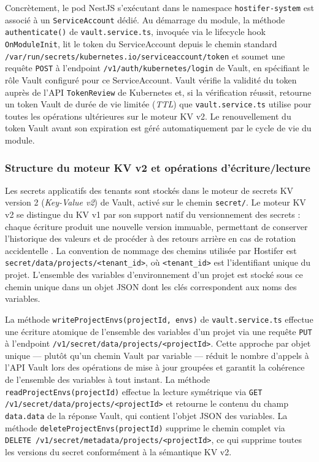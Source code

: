 Concrètement, le pod NestJS s'exécutant dans le namespace \texttt{hostifer-system} est associé à un \texttt{ServiceAccount} dédié. Au démarrage du module, la méthode \texttt{authenticate()} de \texttt{vault.service.ts}, invoquée via le lifecycle hook \texttt{OnModuleInit}, lit le token du ServiceAccount depuis le chemin standard \texttt{/var/run/secrets/kubernetes.io/serviceaccount/token} et soumet une requête \texttt{POST} à l'endpoint \texttt{/v1/auth/kubernetes/login} de Vault, en spécifiant le rôle Vault configuré pour ce ServiceAccount. Vault vérifie la validité du token auprès de l'API \texttt{TokenReview} de Kubernetes et, si la vérification réussit, retourne un token Vault de durée de vie limitée (\textit{TTL}) que \texttt{vault.service.ts} utilise pour toutes les opérations ultérieures sur le moteur KV v2. Le renouvellement du token Vault avant son expiration est géré automatiquement par le cycle de vie du module.

\subsubsection*{Structure du moteur KV v2 et opérations d'écriture/lecture}

Les secrets applicatifs des tenants sont stockés dans le moteur de secrets KV version 2 (\textit{Key-Value v2}) de Vault, activé sur le chemin \texttt{secret/}. Le moteur KV v2 se distingue du KV v1 par son support natif du versionnement des secrets : chaque écriture produit une nouvelle version immuable, permettant de conserver l'historique des valeurs et de procéder à des retours arrière en cas de rotation accidentelle \cite{vault-kv2}. La convention de nommage des chemins utilisée par Hostifer est \texttt{secret/data/projects/<tenant\_id>}, où \texttt{<tenant\_id>} est l'identifiant unique du projet. L'ensemble des variables d'environnement d'un projet est stocké sous ce chemin unique dans un objet JSON dont les clés correspondent aux noms des variables.

La méthode \texttt{writeProjectEnvs(projectId, envs)} de \texttt{vault.service.ts} effectue une écriture atomique de l'ensemble des variables d'un projet via une requête \texttt{PUT} à l'endpoint \texttt{/v1/secret/data/projects/<projectId>}. Cette approche par objet unique — plutôt qu'un chemin Vault par variable — réduit le nombre d'appels à l'API Vault lors des opérations de mise à jour groupées et garantit la cohérence de l'ensemble des variables à tout instant. La méthode \texttt{readProjectEnvs(projectId)} effectue la lecture symétrique via \texttt{GET /v1/secret/data/projects/<projectId>} et retourne le contenu du champ \texttt{data.data} de la réponse Vault, qui contient l'objet JSON des variables. La méthode \texttt{deleteProjectEnvs(projectId)} supprime le chemin complet via \texttt{DELETE /v1/secret/metadata/projects/<projectId>}, ce qui supprime toutes les versions du secret conformément à la sémantique KV v2.

